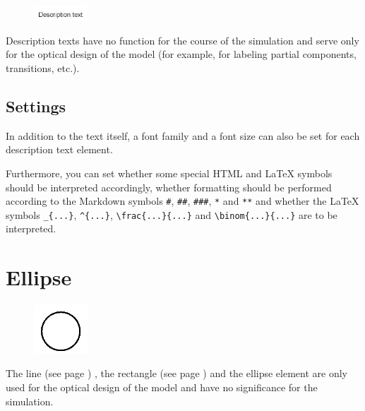 \begin{figure}
\vspace{-22pt}
\includegraphics[width=2cm]{imageModelElementText.png}
\vspace{-22pt}
\end{figure}

Description texts have no function for the course of the simulation
and serve only for the optical design of the model
(for example, for labeling partial components, transitions, etc.).

\subsection*{Settings}

In addition to the text itself, a font family and a font size can also be set for each description text element.

Furthermore, you can set whether some special HTML and LaTeX symbols should
be interpreted accordingly, whether formatting should be performed according to the Markdown symbols
\texttt{\#}, \texttt{\#\#}, \texttt{\#\#\#}, \texttt{*} and \texttt{**} and whether the LaTeX symbols
\texttt{\_\{...\}}, \texttt{\^{}\{...\}}, \texttt{\textbackslash frac\{...\}\{...\}} and \texttt{\textbackslash binom\{...\}\{...\}}
are to be interpreted.


\section{Ellipse}
\label{ref:ModelElementEllipse}

\begin{figure}
\vspace{-22pt}
\includegraphics[width=2cm]{imageModelElementEllipse.png}
\vspace{-22pt}
\end{figure}

The line (see page \pageref{ref:ModelElementLine}) , the rectangle (see page \pageref{ref:ModelElementRectangle}) 
and the ellipse element are only used for the optical design of the model and have no significance for the simulation.

